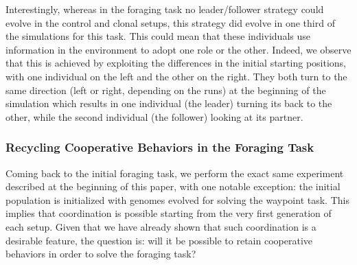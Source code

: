   Interestingly, whereas in the foraging task no leader/follower strategy could evolve in the control and clonal setups, this strategy did evolve in one third of the simulations for this task. This could mean that these individuals use information in the environment to adopt one role or the other. Indeed, we observe that this is achieved by exploiting the differences in the initial starting positions, with one individual on the left and the other on the right. They both turn to the same direction (left or right, depending on the runs) at the beginning of the simulation which results in one individual (the leader) turning its back to the other, while the second individual (the follower) looking at its partner. 


  \subsubsection{Recycling Cooperative Behaviors in the Foraging Task}

  Coming back to the initial foraging task, we perform the exact same experiment described at the beginning of this paper, with one notable exception: the initial population is initialized with genomes evolved for solving the waypoint task. This implies that coordination is possible starting from the very first generation of each setup. Given that we have already shown that such coordination is a desirable feature, the question is: will it be possible to retain cooperative behaviors in order to solve the foraging task?

  \begin{table}[hbtp]
    \caption{Proportion of the 60 independent simulations where the best individual evolved a cooperative strategy (collecting purple targets) or a solitary strategy (collecting green targets) for each setup in the foraging task when individuals are previously evolved in the waypoints task. In addition, the repartition of the different strategies is indicated when cooperation evolved: \emph{Leader/Follower} (Lead.) or \emph{Turning} (Turn.).}
    \label{tab:RecyclingCoopBehaviors}
  \end{table}

